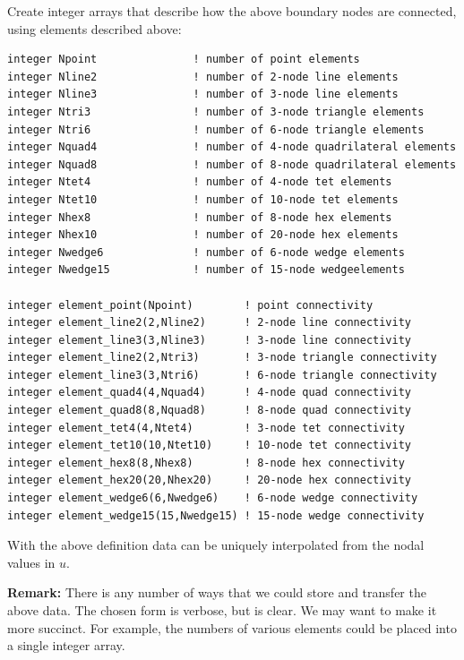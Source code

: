 \documentclass[11pt]{article}
\begin{document}
Create integer arrays that describe how the above boundary nodes are
connected, using elements described above:
\begin{verbatim}
integer Npoint               ! number of point elements
integer Nline2               ! number of 2-node line elements
integer Nline3               ! number of 3-node line elements
integer Ntri3                ! number of 3-node triangle elements
integer Ntri6                ! number of 6-node triangle elements
integer Nquad4               ! number of 4-node quadrilateral elements
integer Nquad8               ! number of 8-node quadrilateral elements
integer Ntet4                ! number of 4-node tet elements
integer Ntet10               ! number of 10-node tet elements
integer Nhex8                ! number of 8-node hex elements
integer Nhex10               ! number of 20-node hex elements
integer Nwedge6              ! number of 6-node wedge elements
integer Nwedge15             ! number of 15-node wedgeelements

integer element_point(Npoint)        ! point connectivity
integer element_line2(2,Nline2)      ! 2-node line connectivity
integer element_line3(3,Nline3)      ! 3-node line connectivity
integer element_line2(2,Ntri3)       ! 3-node triangle connectivity
integer element_line3(3,Ntri6)       ! 6-node triangle connectivity
integer element_quad4(4,Nquad4)      ! 4-node quad connectivity
integer element_quad8(8,Nquad8)      ! 8-node quad connectivity
integer element_tet4(4,Ntet4)        ! 3-node tet connectivity
integer element_tet10(10,Ntet10)     ! 10-node tet connectivity
integer element_hex8(8,Nhex8)        ! 8-node hex connectivity
integer element_hex20(20,Nhex20)     ! 20-node hex connectivity
integer element_wedge6(6,Nwedge6)    ! 6-node wedge connectivity
integer element_wedge15(15,Nwedge15) ! 15-node wedge connectivity

\end{verbatim}

With the above definition data can be uniquely interpolated from the nodal
values in $u$.

\textbf{Remark:} There is any number of ways that we could store and
transfer the above data.  The chosen form is verbose, but is clear.  We may
want to make it more succinct.  For example, the numbers of various elements
could be placed into a single integer array.  
\end{document}
